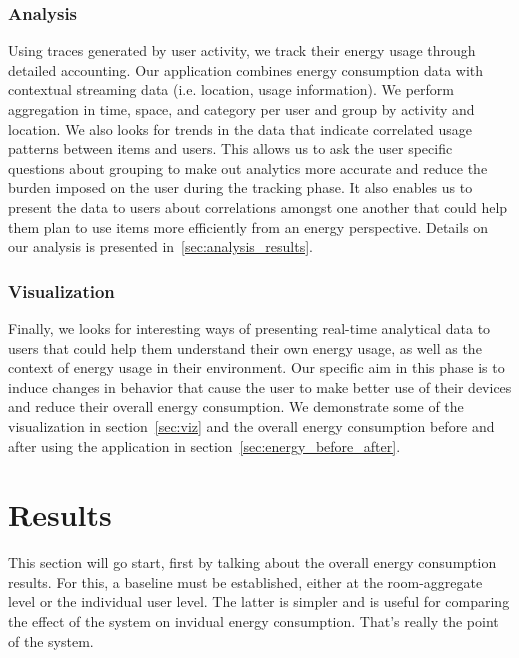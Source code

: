 \subsubsection{Analysis}
Using traces generated by user activity, we track their energy usage through detailed accounting.  Our application combines energy consumption data
with contextual streaming data (i.e. location, usage information).  We perform aggregation in time, space, and category per user and group by activity
and location.  We also looks for trends in the data that indicate correlated usage patterns between items and users.  This allows us to ask
the user specific questions about grouping to make out analytics more accurate and reduce the burden imposed on the user during the tracking phase.
It also enables us to present the data to users about correlations amongst one another that could help them plan to use items more efficiently
from an energy perspective.  Details on our analysis is presented in~\ref{sec:analysis_results}.

\subsubsection{Visualization}
Finally, we looks for interesting ways of presenting real-time analytical data to users that could help them understand their own energy usage, as
well as the context of energy usage in their environment.  Our specific aim in this phase is to induce changes in behavior that cause the user to
make better use of their devices and reduce their overall energy consumption.  We demonstrate some of the visualization in section~\ref{sec:viz}
and the overall energy consumption before and after using the application in section~\ref{sec:energy_before_after}.


\section{Results}
This section will go start, first by talking about the overall energy consumption results.  For this, a baseline must be established, either
at the room-aggregate level or the individual user level.  The latter is simpler and is useful for comparing the effect of the system on invidual
energy consumption.  That's really the point of the system.



